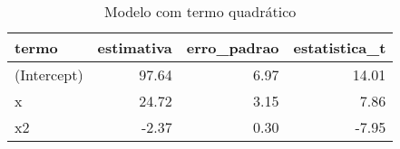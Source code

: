 \begin{table}

\caption{\label{tab:tabela2_exemplo4}Modelo com termo quadrático}
\centering
\begin{tabular}[t]{l|r|r|r}
\hline
termo & estimativa & erro\_padrao & estatistica\_t\\
\hline
(Intercept) & 97.64 & 6.97 & 14.01\\
\hline
x & 24.72 & 3.15 & 7.86\\
\hline
x2 & -2.37 & 0.30 & -7.95\\
\hline
\end{tabular}
\end{table}
